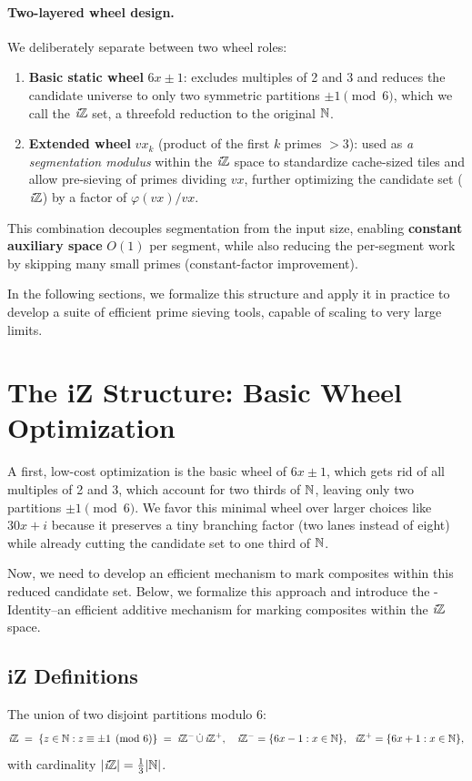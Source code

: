 \documentclass{article}
\begin{document}
\paragraph{Two-layered wheel design.}
We deliberately separate between two wheel roles:
\begin{enumerate}[leftmargin=*]
    \item \textbf{Basic static wheel} $6x\pm1$: excludes multiples of 2 and 3 and reduces the candidate universe to only two symmetric partitions $\pm1 \pmod 6$, which we call the $\textit{i}\mathbb{Z}$ set, a threefold reduction to the original $\mathbb{N}$.    
    \item \textbf{Extended wheel} $vx_k$ (product of the first $k$ primes $>3$): used as \emph{a segmentation modulus} within the $\textit{i}\mathbb{Z}$ space to standardize cache-sized tiles and allow pre-sieving of primes dividing $vx$, further optimizing the candidate set ($\textit{i}\mathbb{Z}$) by a factor of $\varphi(vx)/vx$.
\end{enumerate}
This combination decouples segmentation from the input size, enabling \textbf{constant auxiliary space} $O(1)$ per segment, while also reducing the per-segment work by skipping many small primes (constant-factor improvement).

In the following sections, we formalize this structure and apply it in practice to develop a suite of efficient prime sieving tools, capable of scaling to very large limits.


\section{The iZ Structure: Basic Wheel Optimization} \label{sec:iz_structure}

A first, low-cost optimization is the basic wheel of $6x\pm1$, which gets rid of all multiples of 2 and 3, which account for two thirds of $\mathbb{N}$, leaving only two partitions $\pm1 \pmod 6$.
We favor this minimal wheel over larger choices like $30x+i$ because it preserves a tiny branching factor (two lanes instead of eight) while already cutting the candidate set to one third of $\mathbb{N}$.

Now, we need to develop an efficient mechanism to mark composites within this reduced candidate set.
Below, we formalize this approach and introduce the \Xp-Identity–an efficient additive mechanism for marking composites within the $\textit{i}\mathbb{Z}$ space.

\subsection{iZ Definitions}
\begin{definition}    
    The union of two disjoint partitions modulo 6:
    \[
    \textit{i}\mathbb{Z} \;=\; \{ z\in\mathbb{N} : z\equiv \pm 1 \pmod{6} \} \;=\; \textit{i}\mathbb{Z}^-\,\dot\cup\,\textit{i}\mathbb{Z}^+,
    \quad \textit{i}\mathbb{Z}^- = \{6x-1:x\in\mathbb{N}\},\ \ \textit{i}\mathbb{Z}^+ = \{6x+1:x\in\mathbb{N}\},
    \]
    with cardinality $|\textit{i}\mathbb{Z}| = \frac{1}{3} |\mathbb{N}|$.
\end{definition}
\end{document}
